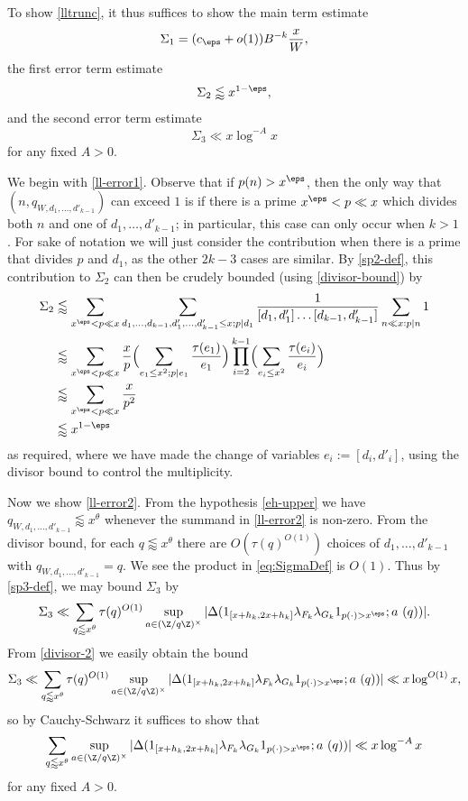 To show \eqref{lltrunc}, it thus suffices to show the main term estimate
\begin{equation}\label{ll-main}
 \Sigma_1= (c_\eps + o(1)) B^{-k} \frac{x}{W},
\end{equation}
the first error term estimate
\begin{equation}\label{ll-error1}
\Sigma_2 \lessapprox x^{1-\eps},
\end{equation}
and the second error term estimate
\begin{equation}\label{ll-error2}
\Sigma_3 \ll x \log^{-A} x
\end{equation}
for any fixed $A>0$.

We begin with \eqref{ll-error1}.  Observe that if $p(n) > x^\eps$, then the only way that $(n,q_{W,d_1,\dots,d'_{k-1}})$ can exceed $1$ is if there is a prime $x^\eps < p \ll x$ which divides both $n$ and one of $d_1,\dots,d'_{k-1}$; in particular, this case can only occur when $k > 1$.  For sake of notation we will just consider the contribution when there is a prime that divides $p$ and $d_1$, as the other $2k-3$ cases are similar.  By \eqref{sp2-def}, this contribution to $\Sigma_2$ can then be crudely bounded (using \eqref{divisor-bound}) by
\begin{align*}
 \Sigma_2&\lessapprox \sum_{x^\eps < p \ll x} \sum_{d_1,\dots,d_{k-1},d'_1,\dots,d'_{k-1} \leq x; p|d_1} \frac{1}{[d_1,d'_1] \dots [d_{k-1},d'_{k-1}]} \sum_{n \ll x: p|n} 1 \\
&\lessapprox \sum_{x^\eps < p \ll x} \frac{x}{p} \Bigl(\sum_{e_1 \leq x^2; p|e_1} \frac{\tau(e_1)}{e_1}\Bigr) \prod_{i=2}^{k-1} \Bigl(\sum_{e_i \leq x^2} \frac{\tau(e_i)}{e_i}\Bigr) \\
&\lessapprox \sum_{x^\eps < p \ll x} \frac{x}{p^2} \\
&\lessapprox x^{1-\eps}
\end{align*}
as required, where we have made the change of variables $e_i := [d_i,d'_i]$, using the divisor bound to control the multiplicity.  

Now we show \eqref{ll-error2}.  From the hypothesis \eqref{eh-upper} we have $q_{W,d_1,\dots,d'_{k-1}} \lessapprox x^\theta$ whenever the summand in \eqref{ll-error2} is non-zero.  From the divisor bound, for each $q \lessapprox x^\theta$ there are $O( \tau(q)^{O(1)})$ choices of $d_1,\dots,d'_{k-1}$ with $q_{W,d_1,\dots,d'_{k-1}} = q$. We see the product in \eqref{eq:SigmaDef} is $O(1)$. Thus by \eqref{sp3-def}, we may bound $\Sigma_3$ by
$$
\Sigma_3 \ll \sum_{q \lessapprox x^\theta} \tau(q)^{O(1)} \sup_{a \in (\Z/q\Z)^\times} |\Delta( 1_{[x+h_k,2x+h_k]} \lambda_{F_k} \lambda_{G_k} 1_{p(\cdot) > x^\eps};  a\ (q))|.
$$
From \eqref{divisor-2} we easily obtain the bound
$$
\Sigma_3\ll \sum_{q \lessapprox x^\theta} \tau(q)^{O(1)} \sup_{a \in (\Z/q\Z)^\times} |\Delta( 1_{[x+h_k,2x+h_k]} \lambda_{F_k} \lambda_{G_k} 1_{p(\cdot) > x^\eps};  a\ (q))| \ll x \log^{O(1)} x,
$$
so by Cauchy-Schwarz it suffices to show that
\begin{equation}\label{local}
\sum_{q \lessapprox x^\theta} \sup_{a \in (\Z/q\Z)^\times} |\Delta( 1_{[x+h_k,2x+h_k]} \lambda_{F_k} \lambda_{G_k} 1_{p(\cdot) > x^\eps};  a\ (q))| \ll x \log^{-A} x
\end{equation}
for any fixed $A>0$.

